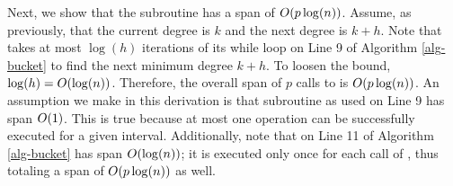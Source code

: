 Next, we show that the subroutine  has a span of $O(p\log(n))$. Assume, as previously, that the current degree is $k$ and the next degree is $k+h$. Note that  takes at most $\log(h)$ iterations of its while loop on Line 9 of Algorithm \ref{alg-bucket} to find the next minimum degree $k+h$. To loosen the bound, $\log(h)=O(\log(n))$. Therefore, the overall span of $p$ calls to  is $O(p \log(n))$. An assumption we make in this derivation is that subroutine  as used on Line 9 has span $O(1)$. This is true because at most one  operation can be successfully executed for a given interval. Additionally, note that  on Line 11 of Algorithm \ref{alg-bucket} has span $O(\log(n))$; it is executed only once for each call of , thus totaling a span of $O(p\log(n))$ as well.


